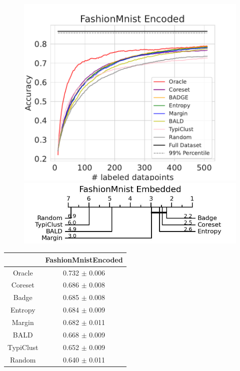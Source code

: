 \documentclass[]{article}
\begin{document}
\begin{minipage}{0.65\linewidth}
\begin{figure}[H]
    \centering
    \includegraphics[width=\linewidth]{img/eval_fmnist_enc} \\ [2mm]
\includegraphics[width=\linewidth]{img/micro_fmnist_enc.jpg} 
\end{figure}
\end{minipage}
\begin{minipage}{0.29\linewidth}
\begin{tabular}{c|c}
&FashionMnistEncoded\\
\hline
Oracle&0.732 $\pm$ 0.006\\
Coreset&0.686 $\pm$ 0.008\\
Badge&0.685 $\pm$ 0.008\\
Entropy&0.684 $\pm$ 0.009\\
Margin&0.682 $\pm$ 0.011\\
BALD&0.668 $\pm$ 0.009\\
TypiClust&0.652 $\pm$ 0.009\\
Random&0.640 $\pm$ 0.011\\
\end{tabular}
\end{minipage}
\end{document}

